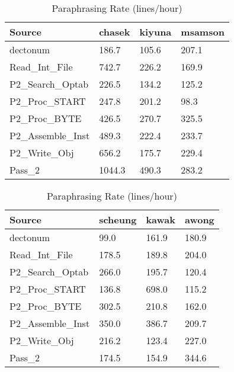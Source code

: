 \begin{table}[hb]
\begin{center}
\begin{tabular}{|l|l|l|l|}
\hline
Source & chasek & kiyuna & msamson\\
\hline
dectonum & 186.7 & 105.6 & 207.1\\
Read\_Int\_File & 742.7 & 226.2 & 169.9\\
P2\_Search\_Optab & 226.5 & 134.2 & 125.2\\
P2\_Proc\_START & 247.8 & 201.2 & 98.3\\
P2\_Proc\_BYTE & 426.5 & 270.7 & 325.5\\
P2\_Assemble\_Inst & 489.3 & 222.4 & 233.7\\
P2\_Write\_Obj & 656.2 & 175.7 & 229.4\\
Pass\_2 & 1044.3 & 490.3 & 283.2\\
\hline
\end{tabular}
\end{center}
\caption{Paraphrasing Rate (lines/hour)}
\end{table}

\begin{table}[hb]
\begin{center}
\begin{tabular}{|l|l|l|l|}
\hline
Source & scheung & kawak & awong\\
\hline
dectonum & 99.0 & 161.9 & 180.9\\
Read\_Int\_File & 178.5 & 189.8 & 204.0\\
P2\_Search\_Optab & 266.0 & 195.7 & 120.4\\
P2\_Proc\_START & 136.8 & 698.0 & 115.2\\
P2\_Proc\_BYTE & 302.5 & 210.8 & 162.0\\
P2\_Assemble\_Inst & 350.0 & 386.7 & 209.7\\
P2\_Write\_Obj & 216.2 & 123.4 & 227.0\\
Pass\_2 & 174.5 & 154.9 & 344.6\\
\hline
\end{tabular}
\end{center}
\caption{Paraphrasing Rate (lines/hour)}
\end{table}


